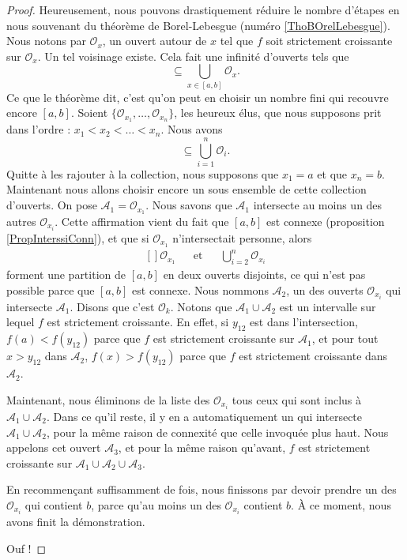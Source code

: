 \documentclass[a4paper,12pt]{book}
\theoremstyle{mes_exemples}	\newtheorem{exemple}[numtho]{Exemple}
\theoremstyle{mes_tho}
\newcommand{\mA}{\mathcal{A}}
\newcommand{\mO}{\mathcal{O}}
\begin{document}
\begin{proof}
	Heureusement, nous pouvons drastiquement réduire le nombre d'étapes en nous souvenant du théorème de Borel-Lebesgue (numéro \ref{ThoBOrelLebesgue}). Nous notons par $\mO_x$, un ouvert autour de $x$ tel que $f$ soit strictement croissante sur $\mO_x$. Un tel voisinage existe. Cela fait une infinité d'ouverts tels que
	\begin{equation}
		[a,b]\subseteq\bigcup_{x\in[a,b]}\mO_x.
	\end{equation}
	Ce que le théorème dit, c'est qu'on peut en choisir un nombre fini qui recouvre encore $[a,b]$. Soient $\{ \mO_{x_1},\ldots,\mO_{x_n} \}$, les heureux élus, que nous supposons prit dans l'ordre : $x_1<x_2<\ldots<x_n$. Nous avons
	\begin{equation}
		[a,b]\subseteq\bigcup_{i=1}^n\mO_i.
	\end{equation}
	Quitte à les rajouter à la collection, nous supposons que $x_1=a$ et que $x_n=b$. Maintenant nous allons choisir encore un sous ensemble de cette collection d'ouverts. On pose $\mA_1=\mO_{x_1}$. Nous savons que $\mA_1$ intersecte au moins un des autres $\mO_{x_i}$. Cette affirmation vient du fait que $[a,b]$ est connexe (proposition \ref{PropInterssiConn}), et que si $\mO_{x_1}$ n'intersectait personne, alors 
	\begin{equation}
		\begin{aligned}[]
			\mO_{x_1}&&\text{et}&&\bigcup_{i=2}^n\mO_{x_i}
		\end{aligned}
	\end{equation}
	forment une partition de $[a,b]$ en deux ouverts disjoints, ce qui n'est pas possible parce que $[a,b]$ est connexe. Nous nommons $\mA_2$, un des ouverts $\mO_{x_i}$ qui intersecte $\mA_1$. Disons que c'est $\mO_k$. Notons que $\mA_1\cup\mA_2$ est un intervalle sur lequel $f$ est strictement croissante. En effet, si $y_{12}$ est dans l'intersection, $f(a)<f(y_{12})$ parce que $f$ est strictement croissante sur $\mA_1$, et pour tout $x>y_{12}$ dans $\mA_2$, $f(x)>f(y_{12})$ parce que $f$ est strictement croissante dans $\mA_2$. 

	Maintenant, nous éliminons de la liste des $\mO_{x_i}$ tous ceux qui sont inclus à $\mA_1\cup\mA_2$. Dans ce qu'il reste, il y en a automatiquement un qui intersecte $\mA_1\cup\mA_2$, pour la même raison de connexité que celle invoquée plus haut. Nous appelons cet ouvert $\mA_3$, et pour la même raison qu'avant, $f$ est strictement croissante sur $\mA_1\cup\mA_2\cup\mA_3$.

	En recommençant suffisamment de fois, nous finissons par devoir prendre un des $\mO_{x_i}$ qui contient $b$, parce qu'au moins un des $\mO_{x_i}$ contient $b$. À ce moment, nous avons finit la démonstration.

	Ouf !
\end{proof}
\end{document}
